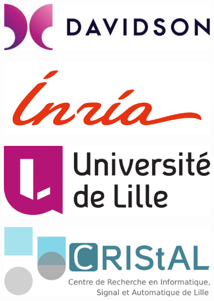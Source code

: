 \thispagestyle{empty}



\begin{figure}[!ht]
    \includegraphics[width=.24\linewidth, keepaspectratio]{Figs/logo-davidson.jpeg}\,
    \includegraphics[width=.24\linewidth]{Figs/logo-inria}\,
    \includegraphics[width=.24\linewidth,trim={0 3em 0 0 }]{Figs/logo-univ-lille}\,
    \includegraphics[width=.24\linewidth]{Figs/logo-cristal}\,


\end{figure}
